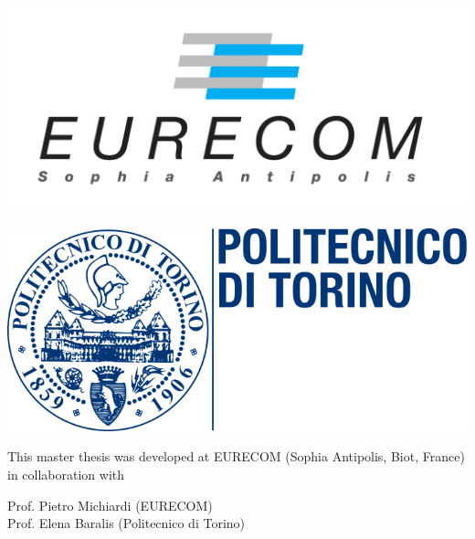 \documentclass[aspectratio=169,handout]{beamer}
\begin{document}
%		
%		
%		
\begin{frame}
	\begin{center}
			\begin{minipage}{0.4\linewidth}
			\begin{center}
				\includegraphics[width=1\linewidth]{img/eurecom.png}
				\label{fig:eurecom}
			\end{center}
			\end{minipage}
			\begin{minipage}{0.4\linewidth}
							\begin{center}
				\includegraphics[width=1\linewidth]{img/polito.png}
				\label{fig:polito}
							\end{center}
			\end{minipage}
	
		This master thesis was developed at EURECOM (Sophia Antipolis, Biot, France)\\in collaboration with
		
		Prof. Pietro Michiardi (EURECOM)\\Prof. Elena Baralis (Politecnico di Torino)
	\end{center}
\end{frame}
\end{document}
